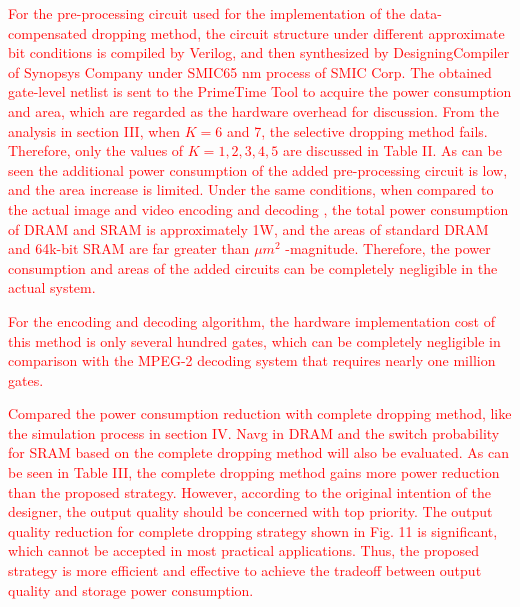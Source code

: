\documentclass[lettersize,journal]{IEEEtran}
\begin{document}
\textcolor{red}{For the pre-processing circuit used for the implementation of the data-compensated dropping method, the circuit structure under different approximate bit conditions is compiled by Verilog, and then synthesized by DesigningCompiler of Synopsys Company under SMIC65 nm process of SMIC Corp. The obtained gate-level netlist is sent to the PrimeTime Tool to acquire the power consumption and area, which are regarded as the hardware overhead for discussion. From the analysis in section III, when $K=6$ and 7, the selective dropping method fails. Therefore, only the values of $K= 1,2,3,4,5$ are discussed in Table II. As can be seen the additional power consumption of the added pre-processing circuit is low, and the area increase is limited. Under the same conditions, when compared to the actual image and video encoding and decoding \cite{4342716}, the total power consumption of DRAM and SRAM is approximately 1W, and the areas of standard DRAM and 64k-bit SRAM are far greater than $\mu m^{2}$ -magnitude. Therefore, the power consumption and areas of the added circuits can be completely negligible in the actual system.}

\textcolor{red}{For the encoding and decoding algorithm, the hardware implementation cost of this method is only several hundred gates, which can be completely negligible in comparison with the MPEG-2 decoding system that requires nearly one million gates.}



\textcolor{red}{Compared the power consumption reduction with complete dropping method, like the simulation process in section IV. Navg in DRAM and the switch probability for SRAM based on the complete dropping method will also be evaluated. As can be seen in Table III, the complete dropping method gains more power reduction than the proposed strategy. However, according to the original intention of the designer, the output quality should be concerned with top priority. The output quality reduction for complete dropping strategy shown in Fig. 11 is significant, which cannot be accepted in most practical applications. Thus, the proposed strategy is more efficient and effective to achieve the tradeoff between output quality and storage power consumption.\\}
\end{document}
